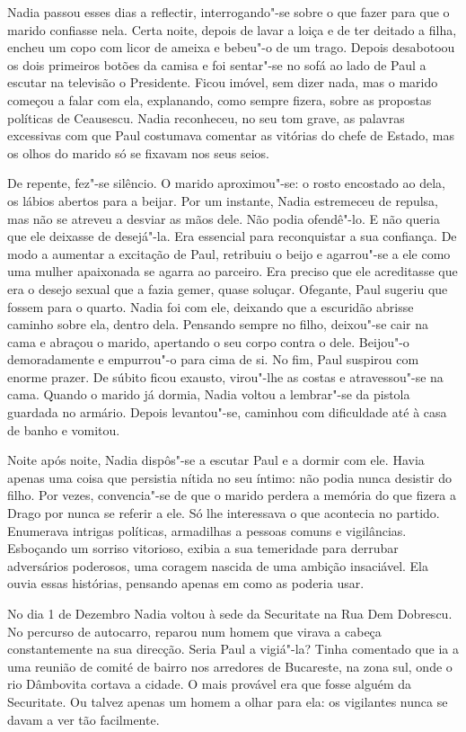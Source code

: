 Nadia passou esses dias a reflectir, interrogando"-se sobre o que fazer
para que o marido confiasse nela. Certa noite, depois de lavar a loiça e
de ter deitado a filha, encheu um copo com licor de ameixa e bebeu"-o de
um trago. Depois desabotoou os dois primeiros botões da camisa e foi
sentar"-se no sofá ao lado de Paul a escutar na
televisão o Presidente. Ficou imóvel, sem dizer nada, mas o marido
começou a falar com ela, explanando, como sempre fizera, sobre as
propostas políticas de Ceausescu. Nadia reconheceu, no seu tom grave, as
palavras excessivas com que Paul costumava comentar as vitórias do
chefe de Estado, mas os olhos do marido só se fixavam nos seus seios.

De repente, fez"-se silêncio. O marido aproximou"-se: o rosto encostado ao
dela, os lábios abertos para a beijar. Por um instante, Nadia estremeceu
de repulsa, mas não se atreveu a desviar as mãos dele. Não podia
ofendê"-lo. E não queria que ele deixasse de desejá"-la. Era essencial
para reconquistar a sua confiança. De modo a aumentar a excitação de
Paul, retribuiu o beijo e agarrou"-se a ele como uma mulher apaixonada se
agarra ao parceiro. Era preciso que ele acreditasse que era o desejo
sexual que a fazia gemer, quase soluçar. Ofegante, Paul sugeriu que
fossem para o quarto. Nadia foi com ele, deixando que a escuridão
abrisse caminho sobre ela, dentro dela. Pensando sempre no filho,
deixou"-se cair na cama e abraçou o marido, apertando o seu corpo contra
o dele. Beijou"-o demoradamente e empurrou"-o para cima de si. No fim,
Paul suspirou com enorme prazer. De súbito ficou exausto, virou"-lhe as
costas e atravessou"-se na cama. Quando o marido já dormia, Nadia voltou
a lembrar"-se da pistola guardada no armário. Depois levantou"-se,
caminhou com dificuldade até à casa de banho e vomitou.

Noite após noite, Nadia dispôs"-se a escutar Paul e a
dormir com ele. Havia apenas uma coisa que persistia nítida no seu
íntimo: não podia nunca desistir do filho. Por
vezes, convencia"-se de que o marido perdera a memória do que fizera a
Drago por nunca se referir a ele. Só lhe interessava o que acontecia
no partido. Enumerava intrigas políticas, armadilhas a pessoas comuns e
vigilâncias. Esboçando um sorriso vitorioso, exibia a sua temeridade
para derrubar adversários poderosos, uma coragem nascida de uma ambição
insaciável. Ela ouvia essas histórias, pensando apenas em como as
poderia usar.

No dia 1 de Dezembro Nadia voltou à sede da Securitate na Rua Dem
Dobrescu. No percurso de autocarro, reparou num homem que virava a
cabeça constantemente na sua direcção. Seria Paul a vigiá"-la? Tinha
comentado que ia a uma reunião de comité de bairro nos arredores de
Bucareste, na zona sul, onde o rio Dâmbovita cortava a cidade. O mais
provável era que fosse alguém da Securitate. Ou talvez apenas um homem
a olhar para ela: os vigilantes nunca se davam a ver tão facilmente.

